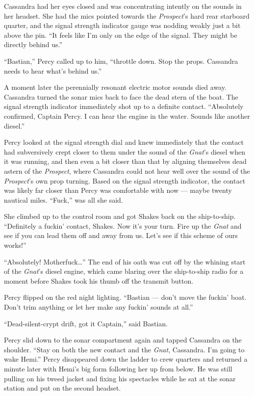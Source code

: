 \documentclass[
]{scrbook}
\begin{document}
Cassandra had her eyes closed and was concentrating intently on the
sounds in her headset. She had the mics pointed towards the
\emph{Prospect}'s hard rear starboard quarter, and the signal strength
indicator gauge was nodding weakly just a bit above the pin. ``It feels
like I'm only on the edge of the signal. They might be directly behind
us.''

``Bastian,'' Percy called up to him, ``throttle down. Stop the props.
Cassandra needs to hear what's behind us.''

A moment later the perennially resonant electric motor sounds died away.
Cassandra turned the sonar mics back to face the dead stern of the boat.
The signal strength indicator immediately shot up to a definite contact.
``Absolutely confirmed, Captain Percy. I can hear the engine in the
water. Sounds like another diesel.''

Percy looked at the signal strength dial and knew immediately that the
contact had subversively crept closer to them under the sound of the
\emph{Gnat}'s diesel when it was running, and then even a bit closer
than that by aligning themselves dead astern of the \emph{Prospect},
where Cassandra could not hear well over the sound of the
\emph{Prospect}'s own prop turning. Based on the signal strength
indicator, the contact was likely far closer than Percy was comfortable
with now --- maybe twenty nautical miles. ``Fuck,'' was all she said.

She climbed up to the control room and got Shakes back on the
ship-to-ship. ``Definitely a fuckin' contact, Shakes. Now it's your
turn. Fire up the \emph{Gnat} and see if you can lead them off and away
from us. Let's see if this scheme of ours works!''

``Absolutely! Motherfuck\ldots{}'' The end of his oath was cut off by
the whining start of the \emph{Gnat}'s diesel engine, which came blaring
over the ship-to-ship radio for a moment before Shakes took his thumb
off the transmit button.

Percy flipped on the red night lighting. ``Bastian --- don't move the
fuckin' boat. Don't trim anything or let her make any fuckin' sounds at
all.''

``Dead-silent-crypt drift, got it Captain,'' said Bastian.

Percy slid down to the sonar compartment again and tapped Cassandra on
the shoulder. ``Stay on both the new contact and the \emph{Gnat},
Cassandra. I'm going to wake Hemi.'' Percy disappeared down the ladder
to crew quarters and returned a minute later with Hemi's big form
following her up from below. He was still pulling on his tweed jacket
and fixing his spectacles while he sat at the sonar station and put on
the second headset.
\end{document}
